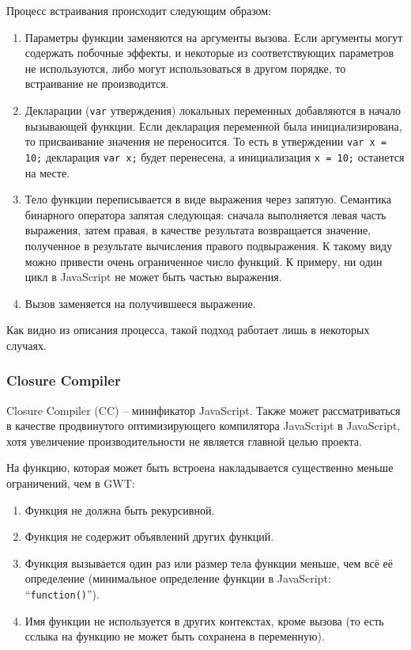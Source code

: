 Процесс встраивания происходит следующим образом:
\begin{enumerate}
  \item Параметры функции заменяются на аргументы вызова.
  Если аргументы могут содержать побочные эффекты, и
  некоторые из соответствующих параметров не используются,
  либо могут использоваться
  в другом порядке, то встраивание не производится.
  \item Декларации (\texttt{var} утверждения) локальных
  переменных добавляются в начало вызывающей функции. Если
  декларация переменной была инициализирована, то присваивание значения
  не переносится. То есть в утверждении \texttt{var x = 10;}
  декларация \texttt{var x;} будет перенесена, а инициализация
  \texttt{x = 10;} останется на месте.
  \item Тело функции переписывается в виде выражения через запятую.
  Семантика бинарного оператора запятая следующая: сначала выполняется левая
  часть выражения, затем правая, в качестве результата возвращается
  значение, полученное в результате вычисления правого подвыражения.
  К такому виду можно привести очень ограниченное число функций.
  К примеру, ни один цикл в JavaScript не может быть частью выражения.
  \item Вызов заменяется на получившееся выражение.
\end{enumerate}

Как видно из описания процесса, такой подход работает
лишь в некоторых случаях.

\subsubsection{Closure Compiler}

Closure Compiler (CC) -- минификатор JavaScript. Также может
рассматриваться в качестве продвинутого оптимизирующего компилятора
JavaScript в JavaScript, хотя увеличение производительности
не является главной целью проекта.

На функцию, которая может быть встроена накладывается
существенно меньше ограничений, чем в GWT:
\begin{enumerate}
  \item Функция не должна быть рекурсивной.
  \item Функция не содержит объявлений других функций.
  \item Функция вызывается один раз или размер тела функции
  меньше, чем всё её определение (минимальное определение
  функции в JavaScript: ``\texttt{function(){}}'').
  \item Имя функции не используется в других контекстах, кроме вызова
  (то есть сслыка на функцию не может быть сохранена в переменную).
\end{enumerate}

